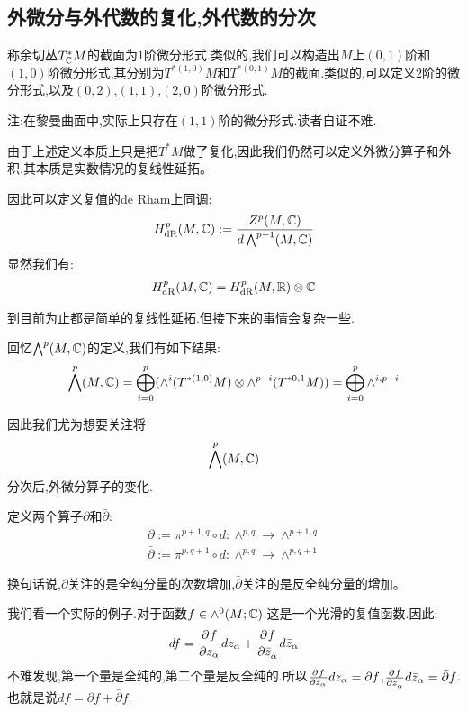 \subsection*{外微分与外代数的复化,外代数的分次}
称余切丛$T_{\mathbb{C}}^*M$的截面为$1$阶微分形式.类似的,我们可以构造出$M$上$(0,1)$阶和$(1,0)$阶微分形式,其分别为$T^{*(1,0)}M$和$T^{*(0,1)}M$的截面.类似的,可以定义$2$阶的微分形式,以及$(0,2)$,$(1,1)$,$(2,0)$阶微分形式.

注:在黎曼曲面中,实际上只存在$(1,1)$阶的微分形式.读者自证不难.

由于上述定义本质上只是把$T^*M$做了复化,因此我们仍然可以定义外微分算子和外积.其本质是实数情况的复线性延拓。

因此可以定义复值的de Rham上同调:
\begin{align*}
	H_{\mathrm{dR}}^p(M,\mathbb{C}):=\frac{Z^p(M,\mathbb{C})}{d\bigwedge^{p-1}(M,\mathbb{C})}
\end{align*}
显然我们有:
\begin{align*}
	H_{\mathrm{dR}}^p(M,\mathbb{C})=H_{\mathrm{dR}}^p(M,\mathbb{R})\otimes \mathbb{C}
\end{align*}

到目前为止都是简单的复线性延拓.但接下来的事情会复杂一些.

回忆$\bigwedge^p(M,\mathbb{C})$的定义,我们有如下结果:
\begin{align*}
	\bigwedge^p(M,\mathbb{C})=\bigoplus_{i=0}^p(\wedge^i(T^{*(1,0)}M)\otimes \wedge^{p-i}(T^{*0,1}M))=\bigoplus_{i=0}^p \wedge^{i,p-i}
\end{align*}

因此我们尤为想要关注将$$\bigwedge^p(M,\mathbb{C})$$分次后,外微分算子的变化.
\begin{definition}
	定义两个算子$\partial$和$\bar{\partial}$:
	\begin{align*}
		\partial:=\pi^{p+1,q}\circ d:\wedge^{p,q}\to \wedge^{p+1,q}\\
		\bar{\partial}:=\pi^{p,q+1}\circ d:\wedge^{p,q}\to \wedge^{p,q+1}
	\end{align*}
\end{definition}
换句话说,$\partial$关注的是全纯分量的次数增加,$\bar{\partial}$关注的是反全纯分量的增加。

我们看一个实际的例子.对于函数$f \in \wedge^0(M;\mathbb{C})$.这是一个光滑的复值函数.因此:
\begin{align*}
	df=\frac{\partial^{} f}{\partial {z_\alpha}^{}}dz_\alpha+\frac{\partial^{} f}{\partial {\bar{z}_\alpha}^{}}d\bar{z}_\alpha
\end{align*}
不难发现,第一个量是全纯的,第二个量是反全纯的.所以$\frac{\partial^{} f}{\partial {z_\alpha}^{}}dz_\alpha=\partial f$,$\frac{\partial^{} f}{\partial {\bar{z}_\alpha}^{}}d\bar{z}_\alpha=\bar{\partial}f$.也就是说$df=\partial f+\bar{\partial}f$.



